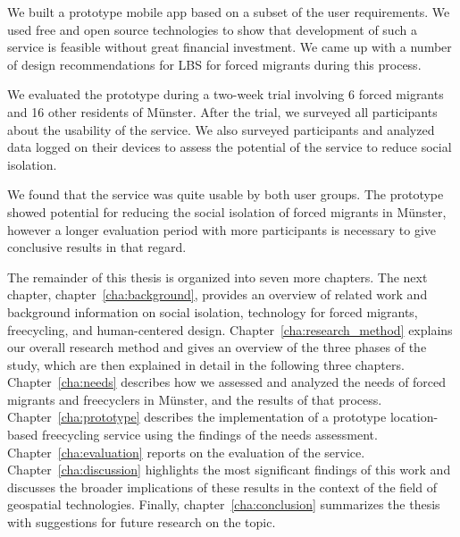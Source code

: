 We built a prototype mobile app based on a subset of the user requirements. We used free and open source technologies to show that development of such a service is feasible without great financial investment. We came up with a number of design recommendations for LBS for forced migrants during this process.

We evaluated the prototype during a two-week trial involving 6 forced migrants and 16 other residents of Münster. After the trial, we surveyed all participants about the usability of the service. We also surveyed participants and analyzed data logged on their devices to assess the potential of the service to reduce social isolation.

We found that the service was quite usable by both user groups. The prototype showed potential for reducing the social isolation of forced migrants in Münster, however a longer evaluation period with more participants is necessary to give conclusive results in that regard.

The remainder of this thesis is organized into seven more chapters. The next chapter, chapter~\ref{cha:background}, provides an overview of related work and background information on social isolation, technology for forced migrants, freecycling, and human-centered design. Chapter~\ref{cha:research_method} explains our overall research method and gives an overview of the three phases of the study, which are then explained in detail in the following three chapters. Chapter~\ref{cha:needs} describes how we assessed and analyzed the needs of forced migrants and freecyclers in Münster, and the results of that process. Chapter~\ref{cha:prototype} describes the implementation of a prototype location-based freecycling service using the findings of the needs assessment. Chapter~\ref{cha:evaluation} reports on the evaluation of the service. Chapter~\ref{cha:discussion} highlights the most significant findings of this work and discusses the broader implications of these results in the context of the field of geospatial technologies. Finally, chapter~\ref{cha:conclusion} summarizes the thesis with suggestions for future research on the topic.
